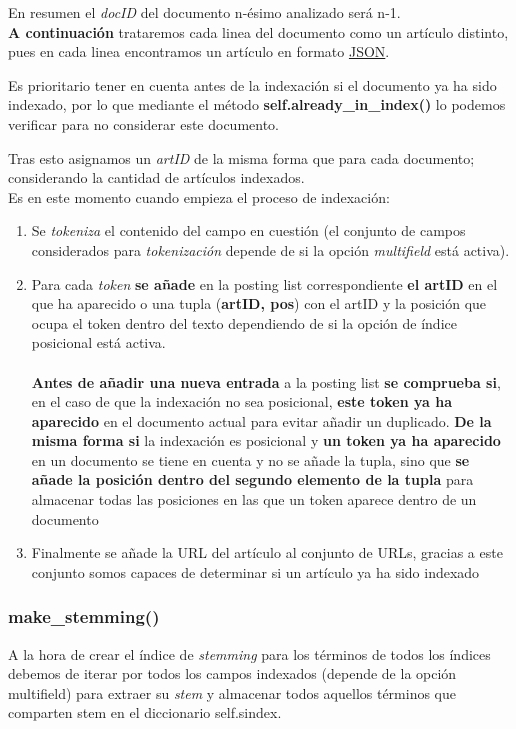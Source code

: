\documentclass[12pt,a4paper]{article}
\begin{document}
En resumen el \textit{docID} del documento n-ésimo analizado será n-1.\\

\textbf{A continuación} trataremos cada linea del documento como un artículo distinto, pues en cada linea encontramos un artículo en formato \href{https://en.wikipedia.org/wiki/JSON}{JSON}.

Es prioritario tener en cuenta antes de la indexación si el documento ya ha sido indexado, por lo que mediante el método \textbf{self.already\_in\_index()} lo podemos verificar para no considerar este documento.

Tras esto asignamos un \textit{artID} de la misma forma que para cada documento; considerando la cantidad de artículos indexados.\\

Es en este momento cuando empieza el proceso de indexación:

\begin{enumerate}
  \item Se \textit{tokeniza} el contenido del campo en cuestión (el conjunto de campos considerados para \textit{tokenización} depende de si la opción \textit{multifield} está activa).
  \item Para cada \textit{token} \textbf{se añade} en la posting list correspondiente \textbf{el artID} en el que ha aparecido o una tupla (\textbf{artID, pos}) con el artID y la posición que ocupa el token dentro del texto dependiendo de si la opción de índice posicional está activa. \\ \\
  \textbf{Antes de añadir una nueva entrada} a la posting list \textbf{se comprueba si}, en el caso de que la indexación no sea posicional, \textbf{este token ya ha aparecido} en el documento actual para evitar añadir un duplicado. \textbf{De la misma forma si} la indexación es posicional y \textbf{un token ya ha aparecido} en un documento se tiene en cuenta y no se añade la tupla, sino que \textbf{se añade la posición dentro del segundo elemento de la tupla} para almacenar todas las posiciones en las que un token aparece dentro de un documento
  \item Finalmente se añade la URL del artículo al conjunto de URLs, gracias a este conjunto somos capaces de determinar si un artículo ya ha sido indexado
\end{enumerate}

\subsubsection{make\_stemming()}
A la hora de crear el índice de \textit{stemming} para los términos de todos los índices debemos de iterar por todos los campos indexados (depende de la opción multifield) para extraer su \textit{stem} y almacenar todos aquellos términos que comparten stem en el diccionario self.sindex.
\end{document}
